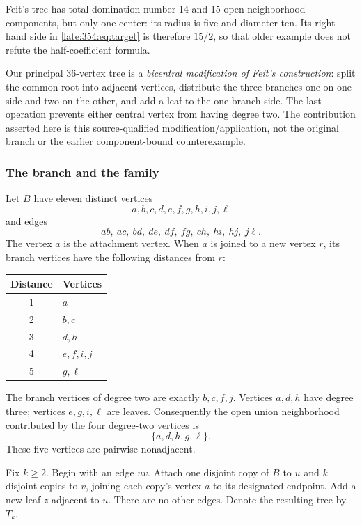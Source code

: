 \documentclass[11pt,a4paper]{article}
\theoremstyle{definition}\newtheorem{definition}[theorem]{Definition}
\theoremstyle{remark}\newtheorem{remark}[theorem]{Remark}
\begin{document}
Feit's tree has total domination number 14 and 15 open-neighborhood components, but only one center: its radius is five and diameter ten. Its right-hand side in \eqref{late:354:eq:target} is therefore $15/2$, so that older example does not refute the half-coefficient formula.

Our principal 36-vertex tree is a \emph{bicentral modification of Feit's construction}: split the common root into adjacent vertices, distribute the three branches one on one side and two on the other, and add a leaf to the one-branch side. The last operation prevents either central vertex from having degree two. The contribution asserted here is this source-qualified modification/application, not the original branch or the earlier component-bound counterexample.

\subsubsection{The branch and the family}
Let $B$ have eleven distinct vertices
\[
a,b,c,d,e,f,g,h,i,j,\ell
\]
and edges
\[
ab,\ ac,\ bd,\ de,\ df,\ fg,\ ch,\ hi,\ hj,\ j\ell.
\]
The vertex $a$ is the attachment vertex. When $a$ is joined to a new vertex $r$, its branch vertices have the following distances from $r$:
\begin{center}
\begin{tabular}{cl}
\toprule
Distance & Vertices \\
\midrule
1 & $a$ \\
2 & $b,c$ \\
3 & $d,h$ \\
4 & $e,f,i,j$ \\
5 & $g,\ell$ \\
\bottomrule
\end{tabular}
\end{center}
The branch vertices of degree two are exactly $b,c,f,j$. Vertices $a,d,h$ have degree three; vertices $e,g,i,\ell$ are leaves. Consequently the open union neighborhood contributed by the four degree-two vertices is
\begin{equation}
\{a,d,h,g,\ell\}.
\label{late:354:eq:five}
\end{equation}
These five vertices are pairwise nonadjacent.

Fix $k\ge2$. Begin with an edge $uv$. Attach one disjoint copy of $B$ to $u$ and $k$ disjoint copies to $v$, joining each copy's vertex $a$ to its designated endpoint. Add a new leaf $z$ adjacent to $u$. There are no other edges. Denote the resulting tree by $T_k$.
\end{document}
